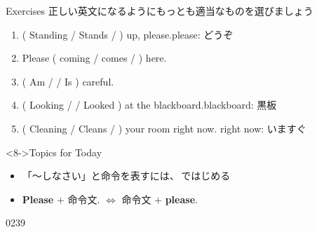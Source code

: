 \documentclass[aspectratio=169,xcolor={dvipsnames,table}]{beamer}
\begin{document}
\begin{frame}[plain]{Exercises}
正しい英文になるようにもっとも適当なものを選びましょう

 \begin{enumerate}
  \item ( Standing / Stands /  ) up, please.\hfill{\scriptsize please: どうぞ}\\
  \item Please ( coming / comes /  ) here.\hfill{}
  \item ( Am /  / Is ) careful.
  \item ( Looking /  / Looked ) at the blackboard.\hfill{\scriptsize blackboard: 黒板}
  \item ( Cleaning / Cleans /  ) your room right now. \hfill{\scriptsize right now: いますぐ}
 \end{enumerate}

\begin{block}<8->{Topics for Today}
\begin{itemize}[square]\small
 \item<8-> 「～しなさい」と命令を表すには、\,ではじめる
 \item<9-> \textbf{Please} $+$ 命令文. $\Longleftrightarrow$ 命令文 $+$ \textbf{ please}.\\
\hfill{\scriptsize {}}
 \end{itemize}
     \end{block}

\hfill{\tiny 0239}\,{\scriptsize {}}
\end{frame}
\end{document}
